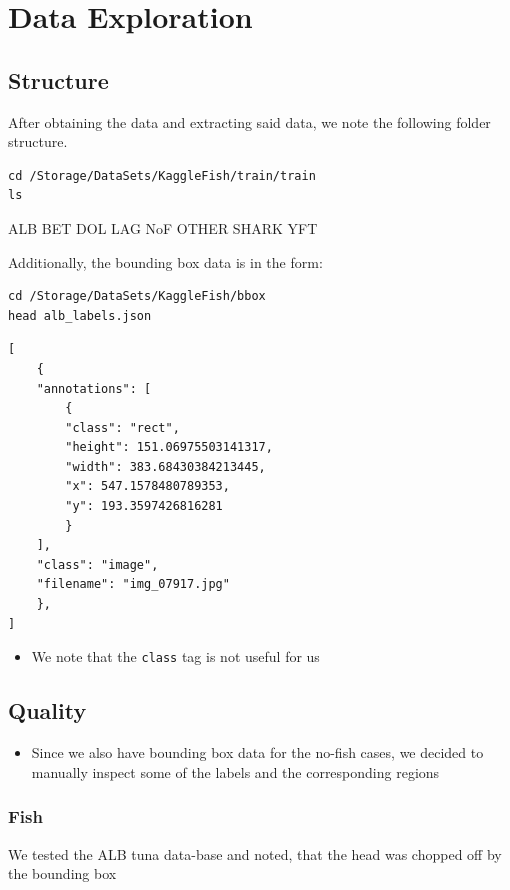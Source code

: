 \documentclass[12pt,a4paper,oneside,headinclude]{scrartcl}
\numberwithin{figure}{section}
\numberwithin{equation}{section}
\numberwithin{table}{section}
\renewenvironment{quote}{\begin{customblockquote}\list{}{\rightmargin=0em\leftmargin=0em}%
\item\relax\color{blockquote-text}\ignorespaces}{\unskip\unskip\endlist\end{customblockquote}}
\begin{document}
\section{Data Exploration}
\label{sec:org1b3b9bd}
\subsection{Structure}
\label{sec:org7232578}
After obtaining the data and extracting said data, we note the following folder
structure.
\begin{verbatim}
cd /Storage/DataSets/KaggleFish/train/train
ls
\end{verbatim}

\begin{quote}
ALB
BET
DOL
LAG
NoF
OTHER
SHARK
YFT
\end{quote}

Additionally, the bounding box data is in the form:
\begin{verbatim}
cd /Storage/DataSets/KaggleFish/bbox
head alb_labels.json
\end{verbatim}

\begin{verbatim}
[
    {
	"annotations": [
	    {
		"class": "rect",
		"height": 151.06975503141317,
		"width": 383.68430384213445,
		"x": 547.1578480789353,
		"y": 193.3597426816281
	    }
	],
	"class": "image",
	"filename": "img_07917.jpg"
    },
]
\end{verbatim}

\begin{itemize}
\item We note that the \texttt{class} tag is not useful for us
\end{itemize}
\subsection{Quality}
\label{sec:orgd0e0f30}
\begin{itemize}
\item Since we also have bounding box data for the no-fish cases, we decided to
manually inspect some of the labels and the corresponding regions
\end{itemize}
\subsubsection{Fish}
\label{sec:org95cf80a}
We tested the ALB tuna data-base and noted, that the head was chopped off by the
bounding box
\end{document}
